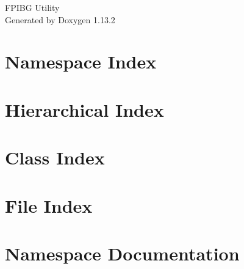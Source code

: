 \documentclass[twoside]{book}
\newcommand{\+}{\discretionary{\mbox{\scriptsize$\hookleftarrow$}}{}{}}
\newcommand{\clearemptydoublepage}{%
    \newpage{\pagestyle{empty}\cleardoublepage}%
  }
\begin{document}
  \raggedbottom
    \hypersetup{pageanchor=false,
                bookmarksnumbered=true,
                pdfencoding=unicode
               }
  \begin{titlepage}
  \vspace*{7cm}
  \begin{center}%
  {\Large FPIBG Utility}\\
  \vspace*{1cm}
  {\large Generated by Doxygen 1.13.2}\\
  \end{center}
  \end{titlepage}
  \clearemptydoublepage
  \tableofcontents
  \clearemptydoublepage
  \hypersetup{pageanchor=true}


\chapter{Namespace Index}

\chapter{Hierarchical Index}

\chapter{Class Index}

\chapter{File Index}

\chapter{Namespace Documentation}

































\end{document}
